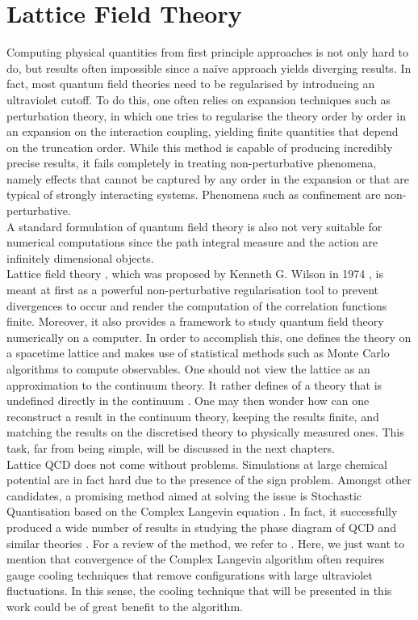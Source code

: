 \section{Lattice Field Theory}
Computing physical quantities from first principle approaches is not only hard to do, but results often impossible since a na\"ive approach yields diverging results. In fact, most quantum field theories need to be regularised by introducing an ultraviolet cutoff. To do this, one often relies on expansion techniques such as perturbation theory, in which one tries to regularise the theory order by order in an expansion on the interaction coupling, yielding finite quantities that depend on the truncation order.  While this method is capable of producing incredibly precise results, it fails completely in treating non-perturbative phenomena, namely effects that cannot be captured by any order in the expansion or that are typical of strongly interacting systems.
Phenomena such as confinement are non-perturbative.\\
A standard formulation of quantum field theory is also not very suitable for numerical computations since the path integral measure and the action are infinitely dimensional objects. \\
Lattice field theory \cite{Montvay1994QuantumLattice,rothe_LGT,gattringer_LQCD,creutz_2023}, which was proposed by Kenneth G. Wilson in 1974 \cite{wilson_lqcd}, is meant at first as a powerful non-perturbative regularisation tool to prevent divergences to occur and render the computation of the correlation functions finite. Moreover, it also provides a framework to study quantum field theory numerically on a computer. In order to accomplish this, one defines the theory on a spacetime lattice and makes use of statistical methods such as Monte Carlo algorithms to compute observables. 
One should not view the lattice as an approximation to the continuum theory. It rather defines of a theory that is undefined directly in the continuum \cite{Wiese:2009qsa}. One may then wonder how can one reconstruct a result in the continuum theory, keeping the results finite, and matching the results on the discretised theory to physically measured ones. This task, far from being simple, will be  discussed in the next chapters.\\
Lattice QCD does not come without problems. Simulations at large chemical potential are in fact hard due to the presence of the sign problem. Amongst other candidates, a promising method aimed at solving the issue is Stochastic Quantisation based on the Complex Langevin equation \cite{Gert_Aarts_2008,Berger_2021,Seiler_2018_status,Aarts_2010}. In fact, it successfully produced a wide number of results in studying the phase diagram of QCD and similar theories \cite{attanasio,Attanasio_2020,langelage2013onset,sinclair2016complex,Sexty_2014}. For a review of the method, we refer to \cite{Aarts_2016,Aarts_2013}. Here, we just want to mention that convergence of the Complex Langevin algorithm often requires gauge cooling techniques \cite{gaugecool} that remove configurations with large ultraviolet fluctuations. 
In this sense, the cooling technique that will be presented in this work could be of great benefit to the algorithm.


